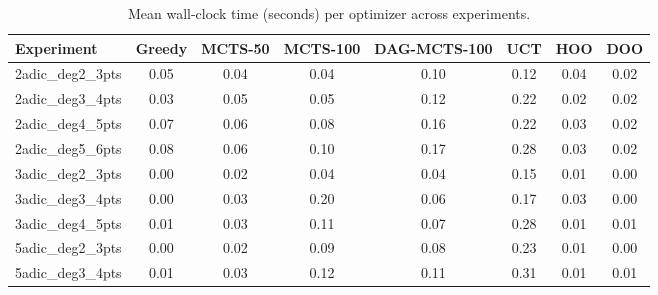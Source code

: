\begin{table}[ht]
\centering
\caption{Mean wall-clock time (seconds) per optimizer across experiments.}
\label{tab:poly-learning-timing}
\begin{tabular}{lccccccc}
\toprule
Experiment & Greedy & MCTS-50 & MCTS-100 & DAG-MCTS-100 & UCT & HOO & DOO \\
\midrule
2adic\_deg2\_3pts & 0.05 & 0.04 & 0.04 & 0.10 & 0.12 & 0.04 & 0.02 \\
2adic\_deg3\_4pts & 0.03 & 0.05 & 0.05 & 0.12 & 0.22 & 0.02 & 0.02 \\
2adic\_deg4\_5pts & 0.07 & 0.06 & 0.08 & 0.16 & 0.22 & 0.03 & 0.02 \\
2adic\_deg5\_6pts & 0.08 & 0.06 & 0.10 & 0.17 & 0.28 & 0.03 & 0.02 \\
3adic\_deg2\_3pts & 0.00 & 0.02 & 0.04 & 0.04 & 0.15 & 0.01 & 0.00 \\
3adic\_deg3\_4pts & 0.00 & 0.03 & 0.20 & 0.06 & 0.17 & 0.03 & 0.00 \\
3adic\_deg4\_5pts & 0.01 & 0.03 & 0.11 & 0.07 & 0.28 & 0.01 & 0.01 \\
5adic\_deg2\_3pts & 0.00 & 0.02 & 0.09 & 0.08 & 0.23 & 0.01 & 0.00 \\
5adic\_deg3\_4pts & 0.01 & 0.03 & 0.12 & 0.11 & 0.31 & 0.01 & 0.01 \\
\bottomrule
\end{tabular}
\end{table}

